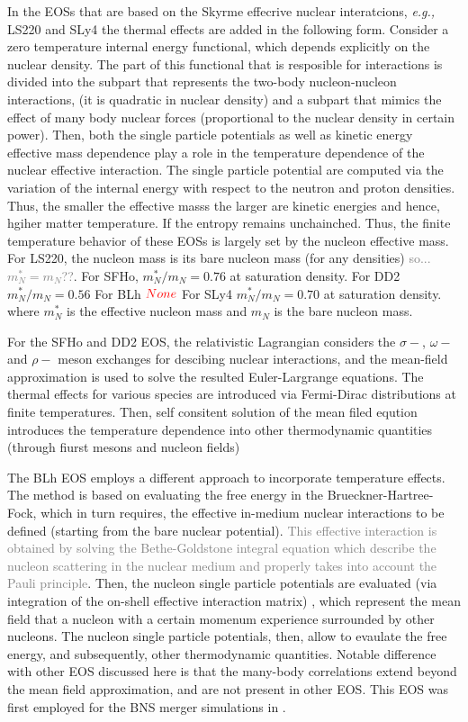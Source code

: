 \documentclass[11pt,a4paper,headinclude=true,DIV=14,BCOR=8mm,chapterprefix,listof=totoc,twoside,openright,abstracton]{scrbook}
\newcommand{\red}[1]{\textcolor{red}{#1}}
\newcommand{\gray}[1]{\textcolor{gray}{#1}}
\begin{document}
In the EOSs that are based on the Skyrme effecrive nuclear interatcions, \textit{e.g.,} LS220 and SLy4
the thermal effects are added in the following form. 
Consider a zero temperature internal energy functional, which depends explicitly on the nuclear density.
The part of this functional that is resposible for interactions is divided into the 
subpart that represents the two-body nucleon-nucleon interactions, (it is quadratic in nuclear density) and a 
subpart that mimics the effect of many body nuclear forces (proportional to the nuclear density in certain power).
Then, both the single particle potentials as well as kinetic energy effective mass dependence play a role
in the temperature dependence of the nuclear effective interaction.
The single particle potential are computed via the variation of the internal energy with respect to the 
neutron and proton densities.
Thus, the smaller the effective masss the larger are kinetic energies and hence, hgiher matter temperature. 
If the entropy remains unchainched.
Thus, the finite temperature behavior of these EOSs is largely set by the nucleon effective mass.
For LS220, the nucleon mass is its bare nucleon mass (for any densities) \gray{so... $m_{N}^*=m_{N}$??}.
For SFHo, $m_N ^* / m_N = 0.76$ at saturation density. 
For DD2 $m_N^*/m_N = 0.56$ 
For BLh $\red{None}$ 
For SLy4 $m_N^*/m_N=0.70$ at saturation density. 
where $m_{N}^*$ is the effective nucleon mass and $m_N$ is the bare nucleon mass.

For the SFHo and DD2 EOS, the relativistic Lagrangian considers the $\sigma-$, $\omega-$ and $\rho-$
meson exchanges for descibing nuclear interactions, and the mean-field approximation is used
to solve the resulted Euler-Largrange equations. 
The thermal effects for various species are introduced via Fermi-Dirac distributions at finite temperatures.
Then, self consitent solution of the mean filed eqution introduces the temperature dependence into other 
thermodynamic quantities (through fiurst mesons and nucleon fields)

The BLh EOS employs a different approach to incorporate temperature effects.
The method is based on evaluating the free energy in the Brueckner-Hartree-Fock, which in turn requires,
the effective in-medium nuclear interactions to be defined (starting from the bare nuclear potential).
\gray{This effective interaction is obtained by solving
    the Bethe-Goldstone integral equation which describe the nucleon 
    scattering in the nuclear medium and properly takes into
    account the Pauli principle}.
Then, the nucleon single particle potentials are evaluated (via integration of the on-shell effective interaction matrix)
, which represent the mean field that a nucleon with a certain momenum experience surrounded by other nucleons.
The nucleon single particle potentials, then, allow to evaulate the free energy, and subsequently, 
other thermodynamic quantities.
Notable difference with other EOS discussed here is that the many-body correlations extend beyond the mean field approximation, and are not present in other EOS. 
This EOS was first employed for the BNS merger simulations in \cite{Bernuzzi:2020txg}.
\end{document}
